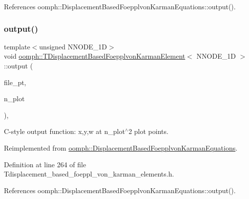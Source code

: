 References oomph\+::\+Displacement\+Based\+Foepplvon\+Karman\+Equations\+::output().

\mbox{\label{classoomph_1_1TDisplacementBasedFoepplvonKarmanElement_a18dfb77359aae414020e12c4025534ab}} 
\subsubsection{\texorpdfstring{output()}{output()}\hspace{0.1cm}{\footnotesize\ttfamily [4/4]}}
{\footnotesize\ttfamily template$<$unsigned N\+N\+O\+D\+E\+\_\+1D$>$ \\
void \hyperlink{classoomph_1_1TDisplacementBasedFoepplvonKarmanElement}{oomph\+::\+T\+Displacement\+Based\+Foepplvon\+Karman\+Element}$<$ N\+N\+O\+D\+E\+\_\+1D $>$\+::output (\begin{DoxyParamCaption}\item[{F\+I\+LE $\ast$}]{file\+\_\+pt,  }\item[{const unsigned \&}]{n\+\_\+plot }\end{DoxyParamCaption})\hspace{0.3cm}{\ttfamily [inline]}, {\ttfamily [virtual]}}



C-\/style output function\+: x,y,w at n\+\_\+plot$^\wedge$2 plot points. 



Reimplemented from \hyperlink{classoomph_1_1DisplacementBasedFoepplvonKarmanEquations_ad5c7fa0d55e2eb85d1f305b05be86a97}{oomph\+::\+Displacement\+Based\+Foepplvon\+Karman\+Equations}.



Definition at line 264 of file Tdisplacement\+\_\+based\+\_\+foeppl\+\_\+von\+\_\+karman\+\_\+elements.\+h.



References oomph\+::\+Displacement\+Based\+Foepplvon\+Karman\+Equations\+::output().

\mbox{\label{classoomph_1_1TDisplacementBasedFoepplvonKarmanElement_a93812c3e443269fa8b272249bdce6b5e}} 
